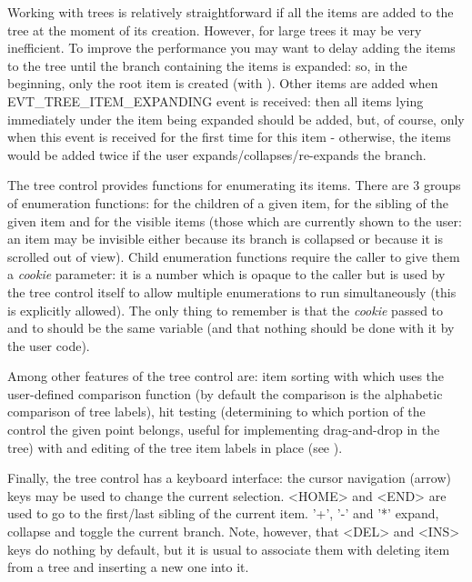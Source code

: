 Working with trees is relatively straightforward if all the items are added to
the tree at the moment of its creation. However, for large trees it may be
very inefficient. To improve the performance you may want to delay adding the
items to the tree until the branch containing the items is expanded: so, in the
beginning, only the root item is created (with 
). Other items are added when
EVT\_TREE\_ITEM\_EXPANDING event is received: then all items lying immediately
under the item being expanded should be added, but, of course, only when this
event is received for the first time for this item - otherwise, the items would
be added twice if the user expands/collapses/re-expands the branch.

The tree control provides functions for enumerating its items. There are 3
groups of enumeration functions: for the children of a given item, for the
sibling of the given item and for the visible items (those which are currently
shown to the user: an item may be invisible either because its branch is
collapsed or because it is scrolled out of view). Child enumeration functions
require the caller to give them a {\it cookie} parameter: it is a number which
is opaque to the caller but is used by the tree control itself to allow
multiple enumerations to run simultaneously (this is explicitly allowed). The
only thing to remember is that the {\it cookie} passed to 
 and to 
 should be the same variable (and
that nothing should be done with it by the user code).

Among other features of the tree control are: item sorting with 
 which uses the user-defined comparison
function  (by default the
comparison is the alphabetic comparison of tree labels), hit testing
(determining to which portion of the control the given point belongs, useful
for implementing drag-and-drop in the tree) with 
 and editing of the tree item labels in
place (see ).

Finally, the tree control has a keyboard interface: the cursor navigation (arrow) keys
may be used to change the current selection. <HOME> and <END> are used to go to
the first/last sibling of the current item. '+', '-' and '*' expand, collapse
and toggle the current branch. Note, however, that <DEL> and <INS> keys do
nothing by default, but it is usual to associate them with deleting item from
a tree and inserting a new one into it.

